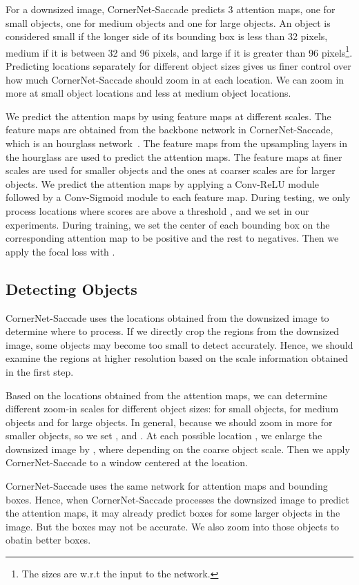 \documentclass{bmvc2k}
\begin{document}
For a downsized image, CornerNet-Saccade predicts 3 attention maps, one for small objects, one for medium objects and one for large objects. An object is considered small if the longer side of its bounding box is less than 32 pixels, medium if it is between 32 and 96 pixels, and large if it is greater than 96 pixels\footnote{The sizes are w.r.t the input to the network.}. Predicting locations separately for different object sizes gives us finer control over how much CornerNet-Saccade should zoom in at each location. We can zoom in more at small object locations and less at medium object locations.

We predict the attention maps by using feature maps at different scales. The feature maps are obtained from the backbone network in CornerNet-Saccade, which is an hourglass network~\cite{newell2016stacked}. The feature maps from the upsampling layers in the hourglass are used to predict the attention maps. The feature maps at finer scales are used for smaller objects and the ones at coarser scales are for larger objects. We predict the attention maps by applying a  Conv-ReLU module followed by a  Conv-Sigmoid module to each feature map. During testing, we only process locations where scores are above a threshold , and we set  in our experiments. During training, we set the center of each bounding box on the corresponding attention map to be positive and the rest to negatives. Then we apply the focal loss with .

\subsection{Detecting Objects}
CornerNet-Saccade uses the locations obtained from the downsized image to determine where to process. If we directly crop the regions from the downsized image, some objects may become too small to detect accurately. Hence, we should examine the regions at higher resolution based on the scale information obtained in the first step. 

Based on the locations obtained from the attention maps, we can determine different zoom-in scales for different object sizes:  for small objects,  for medium objects and  for large objects. In general,  because we should zoom in more for smaller objects, so we set ,  and . At each possible location , we enlarge the downsized image by , where  depending on the coarse object scale. Then we apply CornerNet-Saccade to a  window centered at the location.

CornerNet-Saccade uses the same network for attention maps and bounding boxes. Hence, when CornerNet-Saccade processes the downsized image to predict the attention maps, it may already predict boxes for some larger objects in the image. But the boxes may not be accurate. We also zoom into those objects to obatin better boxes.
\end{document}
